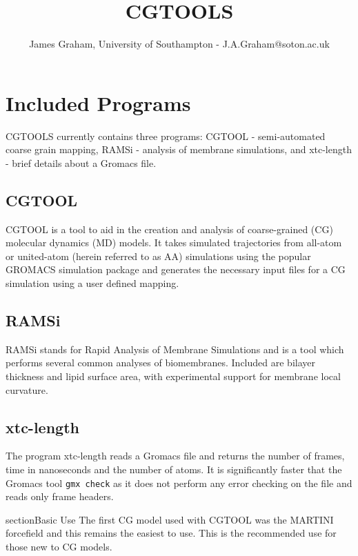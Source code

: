 \documentclass[10pt]{article}
\begin{document}
\title{CGTOOLS}
\author{James Graham, University of Southampton - J.A.Graham@soton.ac.uk}

\maketitle

\tableofcontents

\pagebreak

\section{Included Programs}
CGTOOLS currently contains three programs: CGTOOL - semi-automated coarse grain mapping, RAMSi - analysis of membrane simulations, and xtc-length - brief details about a Gromacs  file.

\subsection{CGTOOL}
CGTOOL is a tool to aid in the creation and analysis of coarse-grained (CG) molecular dynamics (MD) models.  It takes simulated trajectories from all-atom or united-atom (herein referred to as AA) simulations using the popular GROMACS simulation package and generates the necessary input files for a CG simulation using a user defined mapping.

\subsection{RAMSi}
RAMSi stands for Rapid Analysis of Membrane Simulations and is a tool which performs several common analyses of biomembranes.  Included are bilayer thickness and lipid surface area, with experimental support for membrane local curvature.

\subsection{xtc-length}
The program xtc-length reads a Gromacs  file and returns the number of frames, time in nanoseconds and the number of atoms.  It is significantly faster that the Gromacs tool \verb|gmx check| as it does not perform any error checking on the  file and reads only frame headers.

\6section{Basic Use}
The first CG model used with CGTOOL was the MARTINI forcefield and this remains the easiest to use.  This is the recommended use for those new to CG models.
\end{document}
